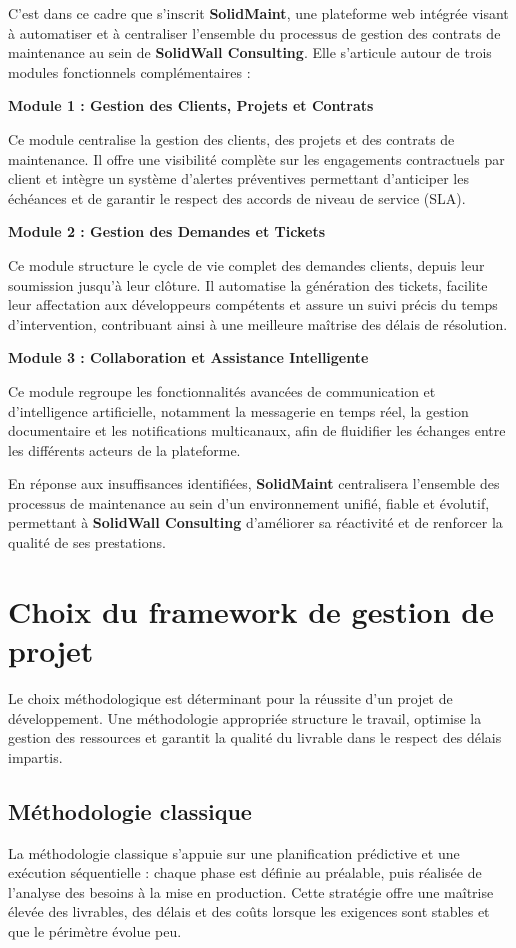 C'est dans ce cadre que s'inscrit \textbf{SolidMaint}, une 
plateforme web intégrée visant à automatiser et à centraliser 
l'ensemble du processus de gestion des contrats de maintenance 
au sein de \textbf{SolidWall Consulting}. Elle s'articule 
autour de trois modules fonctionnels complémentaires :

\noindent\textbf{Module 1 : Gestion des Clients, Projets et Contrats}

Ce module centralise la gestion des clients, des projets et 
des contrats de maintenance. Il offre une visibilité complète 
sur les engagements contractuels par client et intègre un 
système d'alertes préventives permettant d'anticiper les 
échéances et de garantir le respect des accords de niveau 
de service (SLA).

\noindent\textbf{Module 2 : Gestion des Demandes et Tickets}

Ce module structure le cycle de vie complet des demandes 
clients, depuis leur soumission jusqu'à leur clôture. Il 
automatise la génération des tickets, facilite leur 
affectation aux développeurs compétents et assure un suivi 
précis du temps d'intervention, contribuant ainsi à une 
meilleure maîtrise des délais de résolution.

\noindent\textbf{Module 3 : Collaboration et Assistance 
Intelligente}

Ce module regroupe les fonctionnalités avancées de 
communication et d'intelligence artificielle, notamment 
la messagerie en temps réel, la gestion documentaire et 
les notifications multicanaux, afin de fluidifier les 
échanges entre les différents acteurs de la plateforme.

En réponse aux insuffisances identifiées, \textbf{SolidMaint} 
centralisera l'ensemble des processus de maintenance au sein 
d'un environnement unifié, fiable et évolutif, permettant à 
\textbf{SolidWall Consulting} d'améliorer sa réactivité et 
de renforcer la qualité de ses prestations.

\section{Choix du framework de gestion de projet}
\label{sec:methodologie}
Le choix méthodologique est déterminant pour la réussite d'un projet de développement. Une méthodologie appropriée structure le travail, optimise la gestion des ressources et garantit la qualité du livrable dans le respect des délais impartis.

\subsection{Méthodologie classique }
La méthodologie classique s'appuie sur une planification prédictive et une exécution séquentielle : chaque phase est définie au préalable, puis réalisée de l'analyse des besoins à la mise en production. Cette stratégie offre une maîtrise élevée des livrables, des délais et des coûts lorsque les exigences sont stables et que le périmètre évolue peu.

